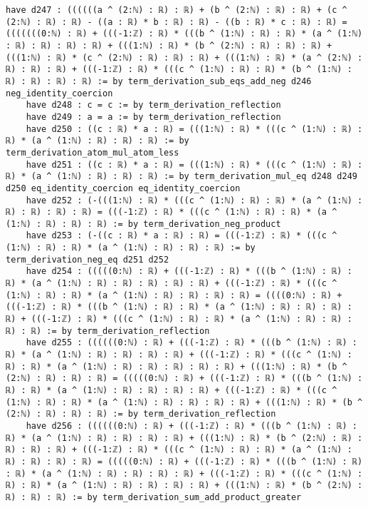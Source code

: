 \documentclass{article}
\begin{document}
\begin{tcolorbox}[colback=white!10, width=\linewidth]
\begin{lstlisting}[language=Lean4]
    have d247 : ((((((a ^ (2:ℕ) : ℝ) : ℝ) + (b ^ (2:ℕ) : ℝ) : ℝ) + (c ^ (2:ℕ) : ℝ) : ℝ) - ((a : ℝ) * b : ℝ) : ℝ) - ((b : ℝ) * c : ℝ) : ℝ) = (((((((0:ℕ) : ℝ) + (((-1:ℤ) : ℝ) * (((b ^ (1:ℕ) : ℝ) : ℝ) * (a ^ (1:ℕ) : ℝ) : ℝ) : ℝ) : ℝ) + (((1:ℕ) : ℝ) * (b ^ (2:ℕ) : ℝ) : ℝ) : ℝ) + (((1:ℕ) : ℝ) * (c ^ (2:ℕ) : ℝ) : ℝ) : ℝ) + (((1:ℕ) : ℝ) * (a ^ (2:ℕ) : ℝ) : ℝ) : ℝ) + (((-1:ℤ) : ℝ) * (((c ^ (1:ℕ) : ℝ) : ℝ) * (b ^ (1:ℕ) : ℝ) : ℝ) : ℝ) : ℝ) := by term_derivation_sub_eqs_add_neg d246 neg_identity_coercion
    have d248 : c = c := by term_derivation_reflection
    have d249 : a = a := by term_derivation_reflection
    have d250 : ((c : ℝ) * a : ℝ) = (((1:ℕ) : ℝ) * (((c ^ (1:ℕ) : ℝ) : ℝ) * (a ^ (1:ℕ) : ℝ) : ℝ) : ℝ) := by term_derivation_atom_mul_atom_less
    have d251 : ((c : ℝ) * a : ℝ) = (((1:ℕ) : ℝ) * (((c ^ (1:ℕ) : ℝ) : ℝ) * (a ^ (1:ℕ) : ℝ) : ℝ) : ℝ) := by term_derivation_mul_eq d248 d249 d250 eq_identity_coercion eq_identity_coercion
    have d252 : (-(((1:ℕ) : ℝ) * (((c ^ (1:ℕ) : ℝ) : ℝ) * (a ^ (1:ℕ) : ℝ) : ℝ) : ℝ) : ℝ) = (((-1:ℤ) : ℝ) * (((c ^ (1:ℕ) : ℝ) : ℝ) * (a ^ (1:ℕ) : ℝ) : ℝ) : ℝ) := by term_derivation_neg_product
    have d253 : (-((c : ℝ) * a : ℝ) : ℝ) = (((-1:ℤ) : ℝ) * (((c ^ (1:ℕ) : ℝ) : ℝ) * (a ^ (1:ℕ) : ℝ) : ℝ) : ℝ) := by term_derivation_neg_eq d251 d252
    have d254 : (((((0:ℕ) : ℝ) + (((-1:ℤ) : ℝ) * (((b ^ (1:ℕ) : ℝ) : ℝ) * (a ^ (1:ℕ) : ℝ) : ℝ) : ℝ) : ℝ) : ℝ) + (((-1:ℤ) : ℝ) * (((c ^ (1:ℕ) : ℝ) : ℝ) * (a ^ (1:ℕ) : ℝ) : ℝ) : ℝ) : ℝ) = ((((0:ℕ) : ℝ) + (((-1:ℤ) : ℝ) * (((b ^ (1:ℕ) : ℝ) : ℝ) * (a ^ (1:ℕ) : ℝ) : ℝ) : ℝ) : ℝ) + (((-1:ℤ) : ℝ) * (((c ^ (1:ℕ) : ℝ) : ℝ) * (a ^ (1:ℕ) : ℝ) : ℝ) : ℝ) : ℝ) := by term_derivation_reflection
    have d255 : ((((((0:ℕ) : ℝ) + (((-1:ℤ) : ℝ) * (((b ^ (1:ℕ) : ℝ) : ℝ) * (a ^ (1:ℕ) : ℝ) : ℝ) : ℝ) : ℝ) + (((-1:ℤ) : ℝ) * (((c ^ (1:ℕ) : ℝ) : ℝ) * (a ^ (1:ℕ) : ℝ) : ℝ) : ℝ) : ℝ) : ℝ) + (((1:ℕ) : ℝ) * (b ^ (2:ℕ) : ℝ) : ℝ) : ℝ) = (((((0:ℕ) : ℝ) + (((-1:ℤ) : ℝ) * (((b ^ (1:ℕ) : ℝ) : ℝ) * (a ^ (1:ℕ) : ℝ) : ℝ) : ℝ) : ℝ) + (((-1:ℤ) : ℝ) * (((c ^ (1:ℕ) : ℝ) : ℝ) * (a ^ (1:ℕ) : ℝ) : ℝ) : ℝ) : ℝ) + (((1:ℕ) : ℝ) * (b ^ (2:ℕ) : ℝ) : ℝ) : ℝ) := by term_derivation_reflection
    have d256 : ((((((0:ℕ) : ℝ) + (((-1:ℤ) : ℝ) * (((b ^ (1:ℕ) : ℝ) : ℝ) * (a ^ (1:ℕ) : ℝ) : ℝ) : ℝ) : ℝ) + (((1:ℕ) : ℝ) * (b ^ (2:ℕ) : ℝ) : ℝ) : ℝ) : ℝ) + (((-1:ℤ) : ℝ) * (((c ^ (1:ℕ) : ℝ) : ℝ) * (a ^ (1:ℕ) : ℝ) : ℝ) : ℝ) : ℝ) = (((((0:ℕ) : ℝ) + (((-1:ℤ) : ℝ) * (((b ^ (1:ℕ) : ℝ) : ℝ) * (a ^ (1:ℕ) : ℝ) : ℝ) : ℝ) : ℝ) + (((-1:ℤ) : ℝ) * (((c ^ (1:ℕ) : ℝ) : ℝ) * (a ^ (1:ℕ) : ℝ) : ℝ) : ℝ) : ℝ) + (((1:ℕ) : ℝ) * (b ^ (2:ℕ) : ℝ) : ℝ) : ℝ) := by term_derivation_sum_add_product_greater

\end{lstlisting}
\end{tcolorbox}
\end{document}
